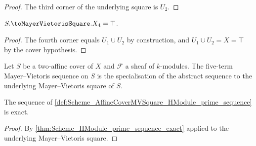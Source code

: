 \begin{proof}


\leanok
  The third corner of the underlying square is \(U_2\).
\end{proof}

\begin{lemma}\leanok
  \label{lem:Scheme_AffineCoverMVSquare_X4}

  \(S.\toMayerVietorisSquare.X_4 = \top\).
\end{lemma}

\begin{proof}


\leanok
  The fourth corner equals \(U_1 \cup U_2\) by construction, and \(U_1 \cup U_2 = X = \top\) by the cover hypothesis.
\end{proof}

\begin{definition}\leanok
  \label{def:Scheme_AffineCoverMVSquare_HModule_prime_sequence}

  Let \(S\) be a two-affine cover of \(X\) and \(\mathcal F\) a sheaf of \(k\)-modules. The five-term Mayer--Vietoris sequence on \(S\) is the specialisation of the abstract sequence to the underlying Mayer--Vietoris square of \(S\).
\end{definition}

\begin{theorem}\leanok
  \label{thm:Scheme_AffineCoverMVSquare_HModule_prime_sequence_exact}

  The sequence of \cref{def:Scheme_AffineCoverMVSquare_HModule_prime_sequence} is exact.
\end{theorem}

\begin{proof}


\leanok
  By \cref{thm:Scheme_HModule_prime_sequence_exact} applied to the underlying Mayer--Vietoris square.
\end{proof}

